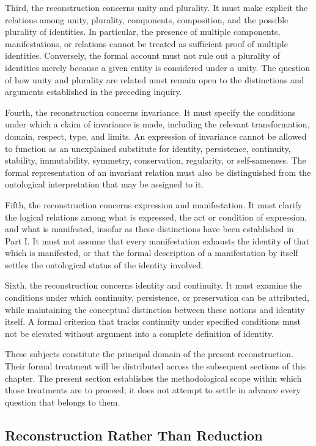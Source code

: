 Third, the reconstruction concerns unity and plurality. It must make
explicit the relations among unity, plurality, components, composition, and
the possible plurality of identities. In particular, the presence of
multiple components, manifestations, or relations cannot be treated as
sufficient proof of multiple identities. Conversely, the formal account
must not rule out a plurality of identities merely because a given entity
is considered under a unity. The question of how unity and plurality are
related must remain open to the distinctions and arguments established in
the preceding inquiry.

Fourth, the reconstruction concerns invariance. It must specify the
conditions under which a claim of invariance is made, including the relevant
transformation, domain, respect, type, and limits. An expression of
invariance cannot be allowed to function as an unexplained substitute for
identity, persistence, continuity, stability, immutability, symmetry,
conservation, regularity, or self-sameness. The formal representation of an
invariant relation must also be distinguished from the ontological
interpretation that may be assigned to it.

Fifth, the reconstruction concerns expression and manifestation. It must
clarify the logical relations among what is expressed, the act or condition
of expression, and what is manifested, insofar as these distinctions have
been established in Part I. It must not assume that every manifestation
exhausts the identity of that which is manifested, or that the formal
description of a manifestation by itself settles the ontological status of
the identity involved.

Sixth, the reconstruction concerns identity and continuity. It must
examine the conditions under which continuity, persistence, or preservation
can be attributed, while maintaining the conceptual distinction between
these notions and identity itself. A formal criterion that tracks continuity
under specified conditions must not be elevated without argument into a
complete definition of identity.

These subjects constitute the principal domain of the present
reconstruction. Their formal treatment will be distributed across the
subsequent sections of this chapter. The present section establishes the
methodological scope within which those treatments are to proceed; it does
not attempt to settle in advance every question that belongs to them.

\subsection{Reconstruction Rather Than Reduction}


